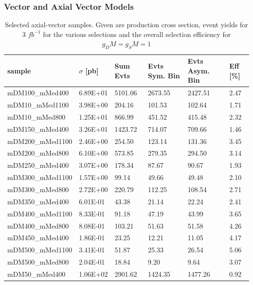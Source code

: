 \subsubsection{Vector and Axial Vector Models}
\begin{table}[h]
\centering
\begin{tabular}{llllll}
\hline
sample             & $\sigma$ [pb] & Sum Evts       & Evts Sym. Bin & Evts Asym. Bin & Eff  [\%]   \\\hline
mDM100\_mMed400  & 6.89E+01 & 5101.06 & 2673.55 & 2427.51 & 2.47 \\
mDM10\_mMed1100  & 3.98E+00 & 204.16   & 101.53   & 102.64   & 1.71 \\
mDM10\_mMed800   & 1.25E+01 & 866.99   & 451.52   & 415.48   & 2.32 \\
mDM150\_mMed400  & 3.26E+01 & 1423.72 & 714.07   & 709.66   & 1.46 \\
mDM200\_mMed1100 & 2.46E+00 & 254.50   & 123.14   & 131.36   & 3.45 \\
mDM200\_mMed800  & 6.10E+00 & 573.85   & 279.35   & 294.50   & 3.14 \\
mDM250\_mMed400  & 3.07E+00 & 178.34   & 87.67    & 90.67    & 1.93 \\
mDM300\_mMed1100 & 1.57E+00 & 99.14    & 49.66    & 49.48    & 2.10 \\
mDM300\_mMed800  & 2.72E+00 & 220.79   & 112.25   & 108.54   & 2.71 \\
mDM350\_mMed400  & 6.01E-01 & 43.38    & 21.14    & 22.24    & 2.41 \\
mDM400\_mMed1100 & 8.33E-01 & 91.18    & 47.19    & 43.99    & 3.65 \\
mDM400\_mMed800  & 8.08E-01 & 103.21   & 51.63    & 51.58    & 4.26 \\
mDM450\_mMed400  & 1.86E-01 & 23.25    & 12.21    & 11.05    & 4.17 \\
mDM500\_mMed1100 & 3.41E-01 & 51.87    & 25.33    & 26.54    & 5.06 \\
mDM500\_mMed800  & 2.04E-01 & 18.84    & 9.20     & 9.64     & 3.07 \\
mDM50\_mMed400   & 1.06E+02 & 2901.62 & 1424.35 & 1477.26 & 0.92\\
\hline
\end{tabular}
\caption{Selected axial-vector samples. Given are production cross section, event yields for 3 $fb^{-1 }$ for the various selections and the overall selection efficiency for $g_DM=g_SM=1$}
\label{tab:dm_A_g1_3fb}
\end{table}


